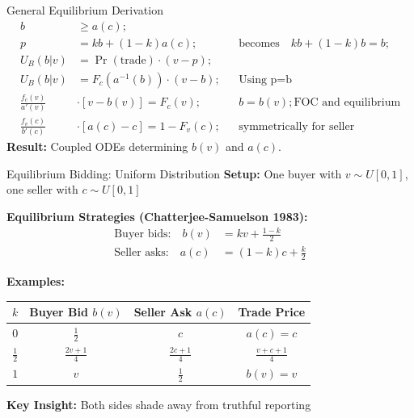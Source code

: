 \documentclass[xcolor={x11names}, aspectratio=169 ]{beamer}
\begin{document}
\begin{frame}{General Equilibrium Derivation}
\begin{align*}
b &\geq a(c);&& \\ 
p &= kb + (1-k)a(c);&&  \text{becomes} \quad kb + (1-k)b = b; \\
U_B(b|v) &= \Pr(\text{trade}) \cdot (v - p);&&  \\
U_B(b|v) &= F_c(a^{-1}(b)) \cdot (v - b);&&  \text{Using p=b} \\
\frac{f_c(v)}{a'(v)}& \cdot [v - b(v)] = F_c(v);&& b = b(v); \text{FOC and equilibrium} \\ 
\frac{f_v(c)}{b'(c)}& \cdot [a(c) - c] = 1 - F_v(c);&& \text{symmetrically for seller}
\end{align*}
\textbf{Result:} Coupled ODEs determining $b(v)$ and $a(c)$. 
\end{frame}

\begin{frame}{Equilibrium Bidding: Uniform Distribution}
\textbf{Setup:} One buyer with $v \sim U[0,1]$, one seller with $c \sim U[0,1]$

\textbf{Equilibrium Strategies (Chatterjee-Samuelson 1983):}
\begin{align*}
\text{Buyer bids:} \quad b(v) &= kv + \frac{1-k}{2} \\
\text{Seller asks:} \quad a(c) &= (1-k)c + \frac{k}{2}
\end{align*}

\textbf{Examples:}
\begin{center}
\begin{tabular}{cccc}
\toprule
$k$ & Buyer Bid $b(v)$ & Seller Ask $a(c)$ & Trade Price \\
\midrule
$0$ & $\frac{1}{2}$ & $c$ & $a(c) = c$ \\[0.2cm]
$\frac{1}{2}$ & $\frac{2v+1}{4}$ & $\frac{2c+1}{4}$ & $\frac{v+c+1}{4}$ \\[0.2cm]
$1$ & $v$ & $\frac{1}{2}$ & $b(v) = v$ \\
\bottomrule
\end{tabular}
\end{center}

\textbf{Key Insight:} Both sides shade away from truthful reporting
\end{frame}
\end{document}
